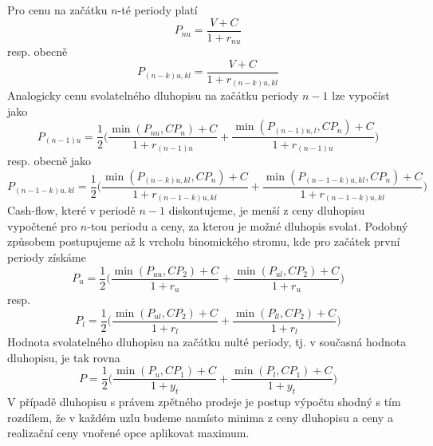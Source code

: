 \documentclass[a4paper]{book}
\begin{document}
Pro cenu na začátku $n$-té periody platí
\begin{equation*}
P_{nu} = \frac{V + C}{1 + r_{nu}}
\end{equation*}
resp. obecně
\begin{equation*}
P_{(n-k)u, kl} = \frac{V + C}{1 + r_{(n-k)u,kl}}
\end{equation*}
Analogicky cenu svolatelného dluhopisu na začátku periody $n-1$ lze vypočíst jako
\begin{equation*}
P_{(n-1)u} = \frac{1}{2}\Bigg( \frac{\min(P_{nu}, CP_{n}) + C}{1 + r_{(n-1)u}} + \frac{\min(P_{(n-1)u,l}, CP_{n}) + C}{1 + r_{(n-1)u}}\Bigg)
\end{equation*}
resp. obecně jako
\begin{equation*}
P_{(n-1-k)u, kl} = \frac{1}{2}\Bigg( \frac{\min(P_{(n-k)u,kl}, CP_{n}) + C}{1 + r_{(n-1-k)u,kl}} + \frac{\min(P_{(n-1-k)u,kl}, CP_{n}) + C}{1 + r_{(n-1-k)u,kl}}\Bigg)
\end{equation*}
Cash-flow, které v periodě $n-1$ diskontujeme, je menší z ceny dluhopisu vypočtené pro $n$-tou periodu a ceny, za kterou je možné dluhopis svolat. Podobný způsobem postupujeme až k vrcholu binomického stromu, kde pro začátek první periody získáme
\begin{equation*}
P_u = \frac{1}{2} \Bigg( \frac{\min(P_{uu}, CP_2)+C}{1 + r_u} + \frac{\min(P_{ul}, CP_2) + C}{1 + r_u} \Bigg)
\end{equation*}
resp.
\begin{equation*}
P_l = \frac{1}{2} \Bigg( \frac{\min(P_{ul}, CP_2)+C}{1 + r_l} + \frac{\min(P_{ll}, CP_2) + C}{1 + r_l} \Bigg)
\end{equation*}
Hodnota svolatelného dluhopisu na začátku nulté periody, tj. v současná hodnota dluhopisu, je tak rovna
\begin{equation*}
P = \frac{1}{2}\Bigg( \frac{\min(P_u, CP_1) + C}{1 + y_t} + \frac{\min(P_l, CP_1) + C}{1 + y_t}\Bigg)
\end{equation*}
V případě dluhopisu s právem zpětného prodeje je postup výpočtu shodný s tím rozdílem, že v každém uzlu budeme namísto minima z ceny dluhopisu a ceny a realizační ceny vnořené opce aplikovat maximum.\\
\end{document}
